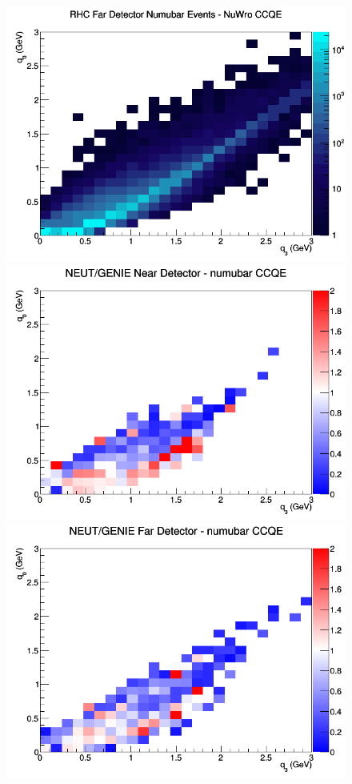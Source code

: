 \begin{figure}[h]
\endminipage
{}
\includegraphics[width=\linewidth]{eff_q0_q3/FGT/CCQE_RHC_FD_numubar_q3_q0_NuWro.png}
\endminipage
\newline
{}
\includegraphics[width=\linewidth]{eff_q0_q3/FGT/ratios/CCQE_NEUT_GENIE_numubar_near_q3_q0.png}
\endminipage
{}
\includegraphics[width=\linewidth]{eff_q0_q3/FGT/ratios/CCQE_NEUT_GENIE_numubar_far_q3_q0.png}

\end{figure}
